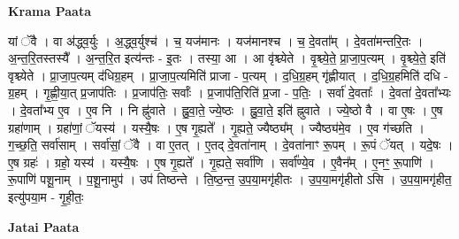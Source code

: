 \documentclass[17pt]{extarticle}
\begin{document}
\textbf{Krama Paata} \newline

यां ॅवै । वा अ॑द्ध्व॒र्युः । अ॒द्ध्व॒र्युश्च॑ । च॒ यज॑मानः । यज॑मानश्च । च॒ दे॒वता᳚म् । दे॒वता॑मन्तरि॒तः । अ॒न्त॒रि॒तस्तस्यै᳚ । अ॒न्त॒रि॒त इत्य॑न्तः - इ॒तः । तस्या॒ आ । आ वृ॑श्च्येते । वृ॒श्च्ये॒ते॒ प्रा॒जा॒प॒त्यम् । वृ॒श्च्ये॒ते॒ इति॑ वृश्च्येते । प्रा॒जा॒प॒त्यम् द॑धिग्र॒हम् । प्रा॒जा॒प॒त्यमिति॑ प्राजा - प॒त्यम् । द॒धि॒ग्र॒हम् गृ॑ह्णीयात् । द॒धि॒ग्र॒हमिति॑ दधि - ग्र॒हम् । गृ॒ह्णी॒या॒त् 
प्र॒जाप॑तिः । प्र॒जाप॑तिः॒ सर्वाः᳚ । प्र॒जाप॑ति॒रिति॑ प्र॒जा - प॒तिः॒ । सर्वा॑ दे॒वताः᳚ । दे॒वता॑ दे॒वता᳚भ्यः । दे॒वता᳚भ्य ए॒व । ए॒व नि । नि ह्नु॑वाते । ह्नु॒वा॒ते॒ ज्ये॒ष्ठः । ह्नु॒वा॒ते॒ इति॑ ह्नुवाते । ज्ये॒ष्ठो 
वै । वा ए॒षः । ए॒ष ग्रहा॑णाम् । ग्रहा॑णां॒ ॅयस्य॑ । यस्यै॒षः । ए॒ष गृ॒ह्यते᳚ । गृ॒ह्यते॒ ज्यैष्ठ्य᳚म् । ज्यैष्ठ्य॑मे॒व । ए॒व ग॑च्छति । ग॒च्छ॒ति॒ सर्वा॑साम् । सर्वा॑सां॒ ॅवै । वा ए॒तत् । ए॒तद् दे॒वता॑नाम् । दे॒वता॑नाꣳ रू॒पम् । रू॒पं ॅयत् । यदे॒षः । ए॒ष ग्रहः॑ । ग्रहो॒ यस्य॑ । यस्यै॒षः । ए॒ष गृ॒ह्यते᳚ । गृ॒ह्यते॒ सर्वा॑णि । सर्वा᳚ण्ये॒व । ए॒वैन᳚म् । ए॒नꣳ॒॒ रू॒पाणि॑ । रू॒पाणि॑ पशू॒नाम् । प॒शू॒नामुप॑ । उप॑ तिष्ठन्ते । ति॒ष्ठ॒न्त॒ उ॒प॒या॒मगृ॑हीतः । उ॒प॒या॒मगृ॑हीतो ऽसि । उ॒प॒या॒मगृ॑हीत॒ इत्यु॑पया॒म - गृ॒ही॒तः॒ \newline

\textbf{Jatai Paata} \newline
\end{document}
